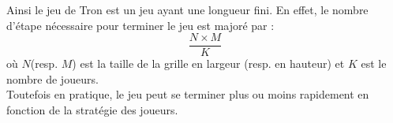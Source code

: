 Ainsi le jeu de Tron est un jeu ayant une longueur fini. En effet, le nombre d'étape nécessaire 
pour terminer le jeu est majoré par :
\begin{equation}
	\label{eq:nb-etapes}
	\frac{N\times M}{K}
\end{equation}
où $N$(resp. $M$) est la taille de la grille en largeur (resp. en hauteur) et $K$ est le nombre de joueurs.\\
Toutefois en pratique, le jeu peut se terminer plus ou moins rapidement en fonction de la stratégie
des joueurs.